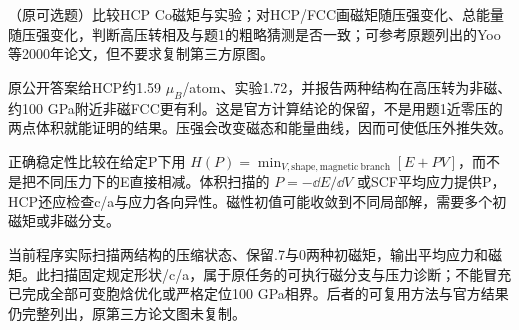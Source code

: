\begin{exercise}\label{task:lab3-extra}
（原可选题）比较HCP Co磁矩与实验；对HCP/FCC画磁矩随压强变化、总能量随压强变化，判断高压转相及与题1的粗略猜测是否一致；可参考原题列出的Yoo等2000年论文，但不要求复制第三方原图。
\end{exercise}
\begin{solution}
原公开答案给HCP约1.59 $\mu_B$/atom、实验1.72，并报告两种结构在高压转为非磁、约100 GPa附近非磁FCC更有利。这是官方计算结论的保留，不是用题1近零压的两点体积就能证明的结果。压强会改变磁态和能量曲线，因而可使低压外推失效。

正确稳定性比较在给定P下用 $H(P)=\min_{V,\mathrm{shape},\mathrm{magnetic\ branch}}[E+PV]$，而不是把不同压力下的E直接相减。体积扫描的 $P=-\dd E/\dd V$ 或SCF平均应力提供P，HCP还应检查c/a与应力各向异性。磁性初值可能收敛到不同局部解，需要多个初磁矩或非磁分支。

当前程序实际扫描两结构的压缩状态、保留.7与0两种初磁矩，输出平均应力和磁矩。此扫描固定规定形状/c/a，属于原任务的可执行磁分支与压力诊断；不能冒充已完成全部可变胞焓优化或严格定位100 GPa相界。后者的可复用方法与官方结果仍完整列出，原第三方论文图未复制。
\end{solution}
